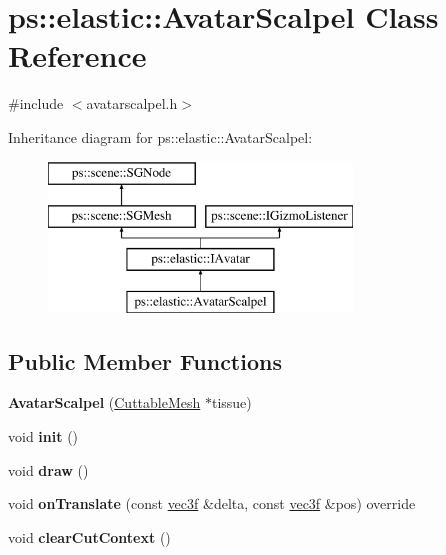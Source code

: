 \hypertarget{classps_1_1elastic_1_1AvatarScalpel}{}\section{ps\+:\+:elastic\+:\+:Avatar\+Scalpel Class Reference}
\label{classps_1_1elastic_1_1AvatarScalpel}


{\ttfamily \#include $<$avatarscalpel.\+h$>$}

Inheritance diagram for ps\+:\+:elastic\+:\+:Avatar\+Scalpel\+:\begin{figure}[H]
\begin{center}
\leavevmode
\includegraphics[height=4.000000cm]{classps_1_1elastic_1_1AvatarScalpel}
\end{center}
\end{figure}
\subsection*{Public Member Functions}
\begin{DoxyCompactItemize}
\item 
\hypertarget{classps_1_1elastic_1_1AvatarScalpel_a2e65c2453c121bec800f2b11acb60d7b}{}{\bfseries Avatar\+Scalpel} (\hyperlink{classps_1_1elastic_1_1CuttableMesh}{Cuttable\+Mesh} $\ast$tissue)\label{classps_1_1elastic_1_1AvatarScalpel_a2e65c2453c121bec800f2b11acb60d7b}

\item 
\hypertarget{classps_1_1elastic_1_1AvatarScalpel_a76a06347e93bc6a7b3468ae6f9212db1}{}void {\bfseries init} ()\label{classps_1_1elastic_1_1AvatarScalpel_a76a06347e93bc6a7b3468ae6f9212db1}

\item 
\hypertarget{classps_1_1elastic_1_1AvatarScalpel_aecf0e668fb5301ee45c169fd9aaed8e9}{}void {\bfseries draw} ()\label{classps_1_1elastic_1_1AvatarScalpel_aecf0e668fb5301ee45c169fd9aaed8e9}

\item 
\hypertarget{classps_1_1elastic_1_1AvatarScalpel_a9e40e85b2cdbaceb1cfc1ed6436240ff}{}void {\bfseries on\+Translate} (const \hyperlink{classps_1_1base_1_1Vec3}{vec3f} \&delta, const \hyperlink{classps_1_1base_1_1Vec3}{vec3f} \&pos) override\label{classps_1_1elastic_1_1AvatarScalpel_a9e40e85b2cdbaceb1cfc1ed6436240ff}

\item 
\hypertarget{classps_1_1elastic_1_1AvatarScalpel_a65f829ad9e630c99cb6370698782fb0c}{}void {\bfseries clear\+Cut\+Context} ()\label{classps_1_1elastic_1_1AvatarScalpel_a65f829ad9e630c99cb6370698782fb0c}

\end{DoxyCompactItemize}
